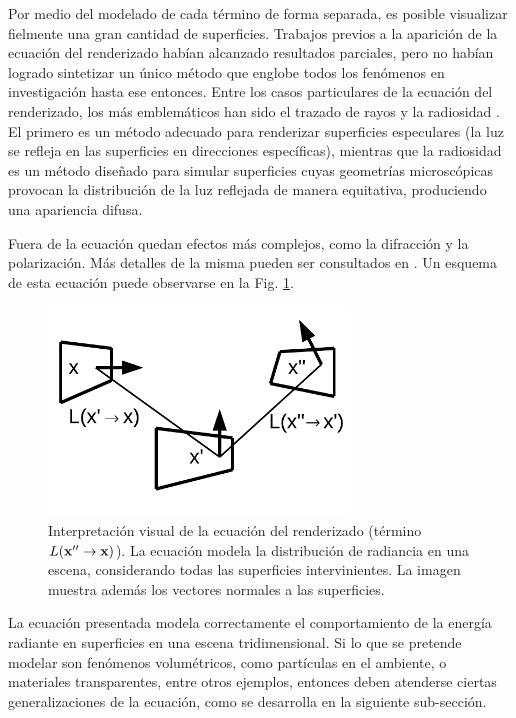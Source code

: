 Por medio del modelado de cada término de forma separada, es posible visualizar fielmente una gran cantidad de superficies.
Trabajos previos a la aparición de la ecuación del renderizado habían alcanzado resultados parciales, pero no habían logrado sintetizar un único método que englobe todos los fenómenos en investigación hasta ese entonces.
Entre los casos particulares de la ecuación del renderizado, los más emblemáticos han sido el trazado de rayos \cite{Whitted1980} y la radiosidad \cite{Goral1984}.
El primero es un método adecuado para renderizar superficies especulares (la luz se refleja en las superficies en direcciones específicas), mientras que la radiosidad es un método diseñado para simular superficies cuyas geometrías microscópicas provocan la distribución de la luz reflejada de manera equitativa, produciendo una apariencia difusa.

Fuera de la ecuación quedan efectos más complejos, como la difracción y la polarización.
Más detalles de la misma pueden ser consultados en \cite{Kajiya1986}.
Un esquema de esta ecuación puede observarse en la Fig. \ref{fg:rendequation}.

\begin{figure}
\center
\includegraphics[width=8cm]{figures/rendequation}
\caption[Interpretación visual de la ecuación del renderizado]{Interpretación visual de la ecuación del renderizado (término $L(\bold{x''}  \rightarrow \bold{x}) $). La ecuación modela la distribución de radiancia en una escena, considerando todas las superficies intervinientes. La imagen muestra además los vectores normales a las superficies.}
\label{fg:rendequation}
\end{figure}

La ecuación presentada modela correctamente el comportamiento de la energía radiante en superficies en una escena tridimensional.
Si lo que se pretende modelar son fenómenos volumétricos, como partículas en el ambiente, o materiales transparentes, entre otros ejemplos, entonces deben atenderse ciertas generalizaciones de la ecuación, como se desarrolla en la siguiente sub-sección.

